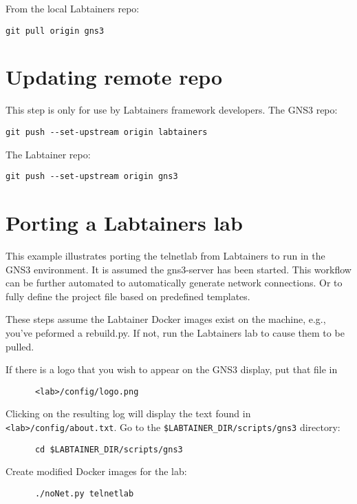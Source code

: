\documentclass[12pt]{article}
\begin{document}
From the local Labtainers repo:
\begin{verbatim}
git pull origin gns3
\end{verbatim}

\section{Updating remote repo}
This step is only for use by Labtainers framework developers.
The GNS3 repo:
\begin{verbatim}
git push --set-upstream origin labtainers
\end{verbatim}

\noindent The Labtainer repo:
\begin{verbatim}
git push --set-upstream origin gns3
\end{verbatim}


\section{Porting a Labtainers lab}
This example illustrates porting the telnetlab from Labtainers to run in the GNS3 environment.
It is assumed the gns3-server has been started.
This workflow can be further automated to automatically generate network connections.  Or to fully define the project
file based on predefined templates.

These steps assume the Labtainer Docker images exist on the machine, e.g., you've peformed a rebuild.py.  If not, run the Labtainers lab
to cause them to be pulled. 

\bigskip
If there is a logo that you wish to appear on the GNS3 display, put that file in 
\begin{verbatim}
      <lab>/config/logo.png
\end{verbatim}
\noindent Clicking on the resulting log will display the text found in {\tt <lab>/config/about.txt}.
\bigskip
Go to the {\tt \$LABTAINER\_DIR/scripts/gns3} directory:
\begin{verbatim}
      cd $LABTAINER_DIR/scripts/gns3
\end{verbatim}

Create modified Docker images for the lab:
\begin{verbatim}
      ./noNet.py telnetlab
\end{verbatim}
\end{document}
